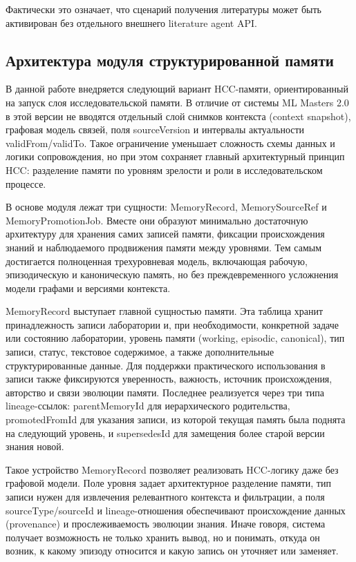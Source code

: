 Фактически это означает, что сценарий получения литературы может быть активирован без отдельного внешнего literature agent API.

\subsection{Архитектура модуля структурированной памяти}

В данной работе внедряется следующий вариант HCC-памяти, ориентированный на запуск слоя исследовательской памяти. В отличие от системы ML Masters 2.0 в этой версии не вводятся отдельный слой снимков контекста (context snapshot), графовая модель связей, поля sourceVersion и интервалы актуальности validFrom/validTo. Такое ограничение уменьшает сложность схемы данных и логики сопровождения, но при этом сохраняет главный архитектурный принцип HCC: разделение памяти по уровням зрелости и роли в исследовательском процессе.

В основе модуля лежат три сущности: MemoryRecord, MemorySourceRef и MemoryPromotionJob. Вместе они образуют минимально достаточную архитектуру для хранения самих записей памяти, фиксации происхождения знаний и наблюдаемого продвижения памяти между уровнями. Тем самым достигается полноценная трехуровневая модель, включающая рабочую, эпизодическую и каноническую память, но без преждевременного усложнения модели графами и версиями контекста.

MemoryRecord выступает главной сущностью памяти. Эта таблица хранит принадлежность записи лаборатории и, при необходимости, конкретной задаче или состоянию лаборатории, уровень памяти (working, episodic, canonical), тип записи, статус, текстовое содержимое, а также дополнительные структурированные данные. Для поддержки практического использования в записи также фиксируются уверенность, важность, источник происхождения, авторство и связи эволюции памяти. Последнее реализуется через три типа lineage-ссылок: parentMemoryId для иерархического родительства, promotedFromId для указания записи, из которой текущая память была поднята на следующий уровень, и supersedesId для замещения более старой версии знания новой.

Такое устройство MemoryRecord позволяет реализовать HCC-логику даже без графовой модели. Поле уровня задает архитектурное разделение памяти, тип записи нужен для извлечения релевантного контекста и фильтрации, а поля sourceType/sourceId и lineage-отношения обеспечивают происхождение данных (provenance) и прослеживаемость эволюции знания. Иначе говоря, система получает возможность не только хранить вывод, но и понимать, откуда он возник, к какому эпизоду относится и какую запись он уточняет или заменяет.

